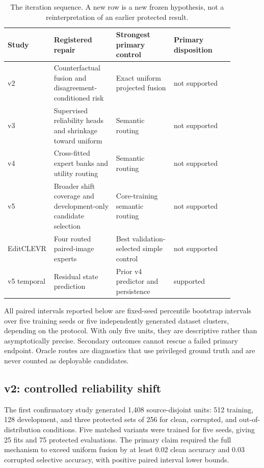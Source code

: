 \documentclass[10pt]{article}
\newcommand{\good}{\textcolor{green!45!black}{supported}}
\newcommand{\bad}{\textcolor{red!65!black}{not supported}}
\begin{document}
\begin{table}[H]
\centering
\small
\setlength{\tabcolsep}{4.2pt}
\begin{tabular}{>{\raggedright\arraybackslash}p{0.10\linewidth}
>{\raggedright\arraybackslash}p{0.27\linewidth}
>{\raggedright\arraybackslash}p{0.25\linewidth}
>{\raggedright\arraybackslash}p{0.26\linewidth}}
\toprule
Study & Registered repair & Strongest primary control & Primary disposition \\
\midrule
v2 & Counterfactual fusion and disagreement-conditioned risk & Exact uniform projected fusion & \bad \\
v3 & Supervised reliability heads and shrinkage toward uniform & Semantic routing & \bad \\
v4 & Cross-fitted expert banks and utility routing & Semantic routing & \bad \\
v5 & Broader shift coverage and development-only candidate selection & Core-training semantic routing & \bad \\
EditCLEVR & Four routed paired-image experts & Best validation-selected simple control & \bad \\
v5 temporal & Residual state prediction & Prior v4 predictor and persistence & \good \\
\bottomrule
\end{tabular}
\caption{The iteration sequence. A new row is a new frozen hypothesis, not a
reinterpretation of an earlier protected result.}
\label{tab:sequence}
\end{table}

All paired intervals reported below are fixed-seed percentile bootstrap intervals over
five training seeds or five independently generated dataset clusters, depending on the
protocol. With only five units, they are descriptive rather than asymptotically precise.
Secondary outcomes cannot rescue a failed primary endpoint. Oracle routes are diagnostics
that use privileged ground truth and are never counted as deployable candidates.

\subsection{v2: controlled reliability shift}
The first confirmatory study generated 1,408 source-disjoint units: 512 training, 128
development, and three protected sets of 256 for clean, corrupted, and out-of-distribution
conditions. Five matched variants were trained for five seeds, giving 25 fits and 75
protected evaluations. The primary claim required the full mechanism to exceed uniform
fusion by at least 0.02 clean accuracy and 0.03 corrupted selective accuracy, with positive
paired interval lower bounds.
\end{document}

